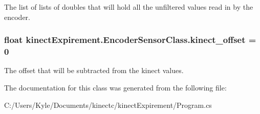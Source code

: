 The list of lists of doubles that will hold all the unfiltered values read in by the encoder. 

\subsubsection[{\texorpdfstring{kinect\+\_\+offset}{kinect_offset}}]{\setlength{\rightskip}{0pt plus 5cm}float kinect\+Expirement.\+Encoder\+Sensor\+Class.\+kinect\+\_\+offset = 0\hspace{0.3cm}{\ttfamily [static]}}\hypertarget{classkinect_expirement_1_1_encoder_sensor_class_a70bb049741404bcfcce7e78a43739e33}{}\label{classkinect_expirement_1_1_encoder_sensor_class_a70bb049741404bcfcce7e78a43739e33}


The offset that will be subtracted from the kinect values. 



The documentation for this class was generated from the following file\+:\begin{DoxyCompactItemize}
\item 
C\+:/\+Users/\+Kyle/\+Documents/kinectc/kinect\+Expirement/Program.\+cs\end{DoxyCompactItemize}
